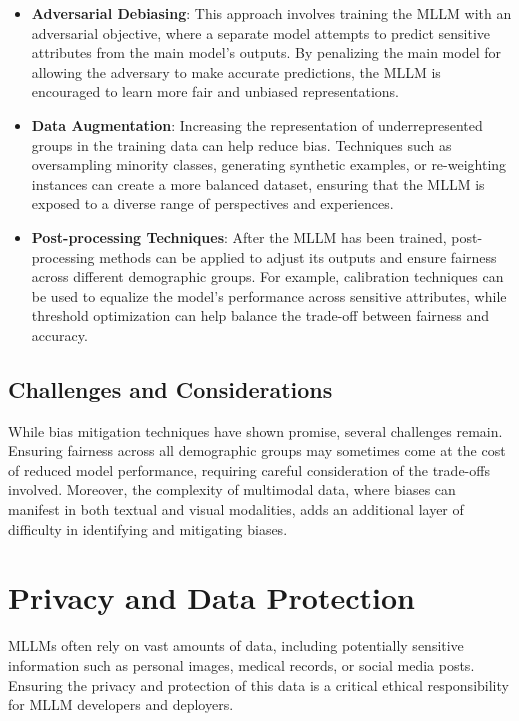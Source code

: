 \begin{itemize}
    \item \textbf{Adversarial Debiasing}: This approach involves training the MLLM with an adversarial objective, where a separate model attempts to predict sensitive attributes from the main model's outputs. By penalizing the main model for allowing the adversary to make accurate predictions, the MLLM is encouraged to learn more fair and unbiased representations.
    
    \item \textbf{Data Augmentation}: Increasing the representation of underrepresented groups in the training data can help reduce bias. Techniques such as oversampling minority classes, generating synthetic examples, or re-weighting instances can create a more balanced dataset, ensuring that the MLLM is exposed to a diverse range of perspectives and experiences.
    
    \item \textbf{Post-processing Techniques}: After the MLLM has been trained, post-processing methods can be applied to adjust its outputs and ensure fairness across different demographic groups. For example, calibration techniques can be used to equalize the model's performance across sensitive attributes, while threshold optimization can help balance the trade-off between fairness and accuracy.
\end{itemize}

\subsection{Challenges and Considerations}

While bias mitigation techniques have shown promise, several challenges remain. Ensuring fairness across all demographic groups may sometimes come at the cost of reduced model performance, requiring careful consideration of the trade-offs involved. Moreover, the complexity of multimodal data, where biases can manifest in both textual and visual modalities, adds an additional layer of difficulty in identifying and mitigating biases.

\section{Privacy and Data Protection}

MLLMs often rely on vast amounts of data, including potentially sensitive information such as personal images, medical records, or social media posts. Ensuring the privacy and protection of this data is a critical ethical responsibility for MLLM developers and deployers.

